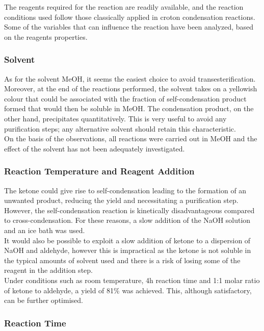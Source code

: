 \documentclass[../Master.tex]{subfiles}
\begin{document}
The reagents required for the reaction are readily available, and the reaction conditions used follow those classically applied in croton condensation reactions. Some of the variables that can influence the reaction have been analyzed, based on the reagents properties.\\

\subsubsection{Solvent}

As for the solvent MeOH, it seems the easiest choice to avoid transesterification.
Moreover, at the end of the reactions performed, the solvent takes on a yellowish colour that could be associated with the fraction of self-condensation product formed that would then be soluble in MeOH. The condensation product, on the other hand, precipitates quantitatively. This is very useful to avoid any purification steps; any alternative solvent should retain this characteristic.\\
On the basis of the observations, all reactions were carried out in MeOH and the effect of the solvent has not been adequately investigated.

\subsubsection{Reaction Temperature and Reagent Addition}

The ketone could give rise to self-condensation leading to the formation of an unwanted product, reducing the yield and necessitating a purification step. However, the self-condensation reaction is kinetically disadvantageous compared to cross-condensation. For these reasons, a slow addition of the NaOH solution and an ice bath was used.\\
It would also be possible to exploit a slow addition of ketone to a dispersion of NaOH and aldehyde, however this is impractical as the ketone is not soluble in the typical amounts of solvent used and there is a risk of losing some of the reagent in the addition step.\\
Under conditions such as room temperature, 4h reaction time and 1:1 molar ratio of ketone to aldehyde, a yield of 81\% was achieved. This, although satisfactory, can be further optimised.

\subsubsection{Reaction Time}
\end{document}

